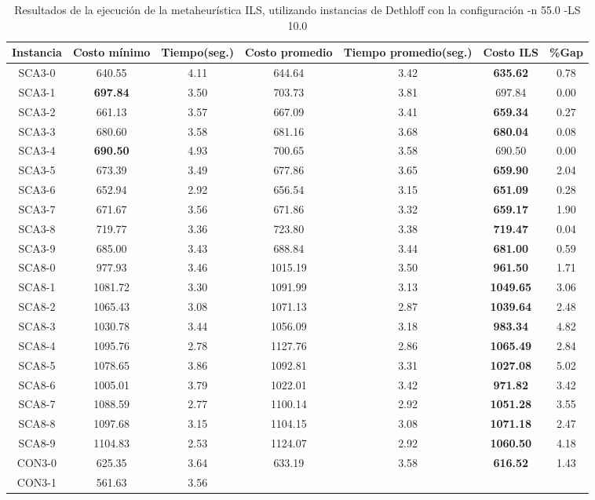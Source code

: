\begin{table}[ht]
\caption{Resultados de la ejecución de la metaheurística ILS, utilizando instancias de Dethloff con la configuración -n 55.0 -LS 10.0}
\centering
\small
\begin{tabular}{c c c c c c c}
\hline\hline
Instancia & Costo mínimo & Tiempo(seg.) & Costo promedio & Tiempo promedio(seg.) & Costo ILS & \%Gap \\ [0.5ex]
\hline
SCA3-0 & 640.55 & 4.11 & 
644.64 & 3.42 & \bf{635.62} & 
0.78\\SCA3-1 & \bf{697.84} & 3.50 & 
703.73 & 3.81 & 697.84 & 0.00\\
SCA3-2 & 661.13 & 3.57 & 
667.09 & 3.41 & \bf{659.34} & 
0.27\\SCA3-3 & 680.60 & 3.58 & 
681.16 & 3.68 & \bf{680.04} & 
0.08\\SCA3-4 & \bf{690.50} & 4.93 & 
700.65 & 3.58 & 690.50 & 0.00\\
SCA3-5 & 673.39 & 3.49 & 
677.86 & 3.65 & \bf{659.90} & 
2.04\\SCA3-6 & 652.94 & 2.92 & 
656.54 & 3.15 & \bf{651.09} & 
0.28\\SCA3-7 & 671.67 & 3.56 & 
671.86 & 3.32 & \bf{659.17} & 
1.90\\SCA3-8 & 719.77 & 3.36 & 
723.80 & 3.38 & \bf{719.47} & 
0.04\\SCA3-9 & 685.00 & 3.43 & 
688.84 & 3.44 & \bf{681.00} & 
0.59\\SCA8-0 & 977.93 & 3.46 & 
1015.19 & 3.50 & \bf{961.50} & 
1.71\\SCA8-1 & 1081.72 & 3.30 & 
1091.99 & 3.13 & \bf{1049.65} & 
3.06\\SCA8-2 & 1065.43 & 3.08 & 
1071.13 & 2.87 & \bf{1039.64} & 
2.48\\SCA8-3 & 1030.78 & 3.44 & 
1056.09 & 3.18 & \bf{983.34} & 
4.82\\SCA8-4 & 1095.76 & 2.78 & 
1127.76 & 2.86 & \bf{1065.49} & 
2.84\\SCA8-5 & 1078.65 & 3.86 & 
1092.81 & 3.31 & \bf{1027.08} & 
5.02\\SCA8-6 & 1005.01 & 3.79 & 
1022.01 & 3.42 & \bf{971.82} & 
3.42\\SCA8-7 & 1088.59 & 2.77 & 
1100.14 & 2.92 & \bf{1051.28} & 
3.55\\SCA8-8 & 1097.68 & 3.15 & 
1104.15 & 3.08 & \bf{1071.18} & 
2.47\\SCA8-9 & 1104.83 & 2.53 & 
1124.07 & 2.92 & \bf{1060.50} & 
4.18\\CON3-0 & 625.35 & 3.64 & 
633.19 & 3.58 & \bf{616.52} & 
1.43\\CON3-1 & 561.63 & 3.56 & 

\end{tabular}
\end{table}
